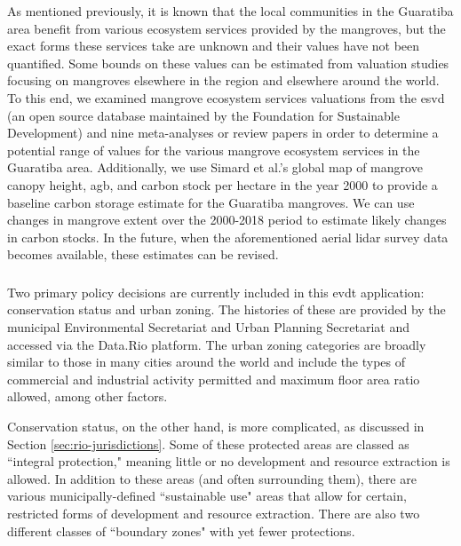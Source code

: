 As mentioned previously, it is known that the local communities in the Guaratiba area benefit from various ecosystem services provided by the mangroves, but the exact forms these services take are unknown and their values have not been quantified. Some bounds on these values can be estimated from valuation studies focusing on mangroves elsewhere in the region and elsewhere around the world. To this end, we examined mangrove ecosystem services valuations from the \ac{esvd} \cite{grootEcosystemServicesValuation2020} (an open source database maintained by the Foundation for Sustainable Development) and nine meta-analyses or review papers \cite{branderEmpiricsWetlandValuation2006,branderEcosystemServiceValues2012, salemEconomicValueMangroves2012, veghMangroveEcosystemServices2014, voReviewValuationMethods2012, himes-cornellMangroveEcosystemService2018, getznerEcosystemServicesMangrove2020, barbierProtectiveServiceMangrove2016, barbierEstuarineCoastalEcosystems2020} in order to determine a potential range of values for the various mangrove ecosystem services in the Guaratiba area. Additionally, we use Simard et al.'s global map of mangrove canopy height, \ac{agb}, and carbon stock per hectare in the year 2000 \cite{simardMangroveCanopyHeight2019} to provide a baseline carbon storage estimate for the Guaratiba mangroves. We can use changes in mangrove extent over the 2000-2018 period to estimate likely changes in carbon stocks. In the future, when the aforementioned aerial \ac{lidar} survey data becomes available, these estimates can be revised.


\subsubsection{}

Two primary policy decisions are currently included in this \ac{evdt} application: conservation status and urban zoning. The histories of these are provided by the municipal Environmental Secretariat and Urban Planning Secretariat and accessed via the Data.Rio platform. The urban zoning categories are broadly similar to those in many cities around the world and include the types of commercial and industrial activity permitted and maximum floor area ratio allowed, among other factors. 

Conservation status, on the other hand, is more complicated, as discussed in Section \ref{sec:rio-jurisdictions}. Some of these protected areas are classed as ``integral protection," meaning little or no development and resource extraction is allowed. In addition to these areas (and often surrounding them), there are various municipally-defined ``sustainable use" areas that allow for certain, restricted forms of development and resource extraction. There are also two different classes of ``boundary zones" with yet fewer protections.

